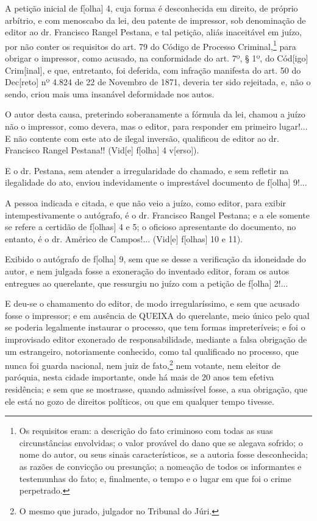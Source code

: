 A petição inicial de f{[}olha{]} 4, cuja forma é desconhecida em
direito, de próprio arbítrio, e com menoscabo da lei, deu patente de
impressor, sob denominação de editor ao dr. Francisco Rangel Pestana, e
tal petição, aliás inaceitável em juízo, por não conter os requisitos do
art. 79 do Código de Processo Criminal,\footnote{Os requisitos eram: a
  descrição do fato criminoso com todas as suas circunstâncias
  envolvidas; o valor provável do dano que se alegava sofrido; o nome do
  autor, ou seus sinais característicos, se a autoria fosse
  desconhecida; as razões de convicção ou presunção; a nomeação de todos
  os informantes e testemunhas do fato; e, finalmente, o tempo e o lugar
  em que foi o crime perpetrado.} para obrigar o impressor, como
acusado, na conformidade do art. 7º, § 1º, do Cód{[}igo{]}
Crim{[}inal{]}, e que, entretanto, foi deferida, com infração manifesta
do art. 50 do Dec{[}reto{]} nº 4.824 de 22 de Novembro de 1871, deveria
ter sido rejeitada, e, não o sendo, criou mais uma insanável deformidade
nos autos.

O autor desta causa, preterindo soberanamente a fórmula da lei, chamou a
juízo não o impressor, como devera, mas o editor, para responder em
primeiro lugar!... E não contente com este ato de ilegal inversão,
qualificou de editor ao dr. Francisco Rangel Pestana!! (Vid{[}e{]}
f{[}olha{]} 4 v{[}erso{]}).

E o dr. Pestana, sem atender a irregularidade do chamado, e sem refletir
na ilegalidade do ato, enviou indevidamente o imprestável documento de
f{[}olha{]} 9!...

A pessoa indicada e citada, e que não veio a juízo, como editor, para
exibir intempestivamente o autógrafo, é o dr. Francisco Rangel Pestana;
e a ele somente se refere a certidão de f{[}olhas{]} 4 e 5; o oficioso
apresentante do documento, no entanto, é o dr. Américo de Campos!...
(Vid{[}e{]} f{[}olhas{]} 10 e 11).

Exibido o autógrafo de f{[}olha{]} 9, sem que se desse a verificação da
idoneidade do autor, e nem julgada fosse a exoneração do inventado
editor, foram os autos entregues ao querelante, que ressurgiu no juízo
com a petição de f{[}olha{]} 2!...

E deu-se o chamamento do editor, de modo irregularíssimo, e sem que
acusado fosse o impressor; e em ausência de QUEIXA do querelante, meio
único pelo qual se poderia legalmente instaurar o processo, que tem
formas impreteríveis; e foi o improvisado editor exonerado de
responsabilidade, mediante a falsa obrigação de um estrangeiro,
notoriamente conhecido, como tal qualificado no processo, que nunca foi
guarda nacional, nem juiz de fato,\footnote{O mesmo que jurado, julgador
  no Tribunal do Júri.} nem votante, nem eleitor de paróquia, nesta
cidade importante, onde há mais de 20 anos tem efetiva residência; e sem
que se mostrasse, quando admissível fosse, a sua obrigação, que ele está
no gozo de direitos políticos, ou que em qualquer tempo tivesse.

